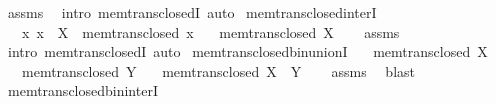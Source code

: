 \begin{isabellebody}
\isamarkupfalse%
\ assms\ \isamarkupfalse%
\ {\isacharparenleft}{\kern0pt}intro\ mem{\isacharunderscore}{\kern0pt}trans{\isacharunderscore}{\kern0pt}closedI{\isacharparenright}{\kern0pt}\ auto%
\endisatagproof
{\isafoldproof}%
%
\isadelimproof
\isanewline
%
\endisadelimproof
\isanewline
{}\isamarkupfalse%
\ mem{\isacharunderscore}{\kern0pt}trans{\isacharunderscore}{\kern0pt}closed{\isacharunderscore}{\kern0pt}interI{\isacharcolon}{\kern0pt}\isanewline
\ \ \ {\isachardoublequoteopen}{\isasymAnd}x{\isachardot}{\kern0pt}\ x\ {\isasymin}\ X\ {\isasymLongrightarrow}\ mem{\isacharunderscore}{\kern0pt}trans{\isacharunderscore}{\kern0pt}closed\ x{\isachardoublequoteclose}\isanewline
\ \ \ {\isachardoublequoteopen}mem{\isacharunderscore}{\kern0pt}trans{\isacharunderscore}{\kern0pt}closed\ {\isacharparenleft}{\kern0pt}{\isasymInter}X{\isacharparenright}{\kern0pt}{\isachardoublequoteclose}\isanewline
%
\isadelimproof
\ \ %
\endisadelimproof
%
\isatagproof
{}\isamarkupfalse%
\ assms\ \isamarkupfalse%
\ {\isacharparenleft}{\kern0pt}intro\ mem{\isacharunderscore}{\kern0pt}trans{\isacharunderscore}{\kern0pt}closedI{\isacharparenright}{\kern0pt}\ auto%
\endisatagproof
{\isafoldproof}%
%
\isadelimproof
\isanewline
%
\endisadelimproof
\isanewline
{}\isamarkupfalse%
\ mem{\isacharunderscore}{\kern0pt}trans{\isacharunderscore}{\kern0pt}closed{\isacharunderscore}{\kern0pt}bin{\isacharunderscore}{\kern0pt}unionI{\isacharcolon}{\kern0pt}\isanewline
\ \ \ {\isachardoublequoteopen}mem{\isacharunderscore}{\kern0pt}trans{\isacharunderscore}{\kern0pt}closed\ X{\isachardoublequoteclose}\isanewline
\ \ \ {\isachardoublequoteopen}mem{\isacharunderscore}{\kern0pt}trans{\isacharunderscore}{\kern0pt}closed\ Y{\isachardoublequoteclose}\isanewline
\ \ \ {\isachardoublequoteopen}mem{\isacharunderscore}{\kern0pt}trans{\isacharunderscore}{\kern0pt}closed\ {\isacharparenleft}{\kern0pt}X\ {\isasymunion}\ Y{\isacharparenright}{\kern0pt}{\isachardoublequoteclose}\isanewline
%
\isadelimproof
\ \ %
\endisadelimproof
%
\isatagproof
{}\isamarkupfalse%
\ assms\ \isamarkupfalse%
\ blast%
\endisatagproof
{\isafoldproof}%
%
\isadelimproof
\isanewline
%
\endisadelimproof
\isanewline
{}\isamarkupfalse%
\ mem{\isacharunderscore}{\kern0pt}trans{\isacharunderscore}{\kern0pt}closed{\isacharunderscore}{\kern0pt}bin{\isacharunderscore}{\kern0pt}interI{\isacharcolon}{\kern0pt}\isanewline

\end{isabellebody}
